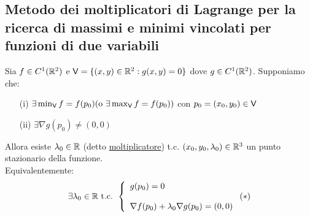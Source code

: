 \subsection{Metodo dei moltiplicatori di Lagrange per la ricerca di massimi e
minimi vincolati per funzioni di due variabili}
\begin{theorem}
  Sia $f \in C^1(\mathbb{R}^2)$ e $\mathsf{V} = \{(x,y)\in \mathbb{R}^2 : g(x,y) = 0\}$ dove $g \in C^1(\mathbb{R}^2)$. Supponiamo che:
  \begin{enumerate}
    \item[(i)] $\exists \min_{\mathsf{V}} f = f(p_0) (\text{o } \exists \max_{\mathsf{V}} f = f(p_0))$ con $p_0 = (x_0,y_0) \in \mathsf{V}$
    \item[(ii)] $\exists \nabla g(p_0) \not = (0,0)$
  \end{enumerate}
  Allora esiste $\lambda_0 \in \mathbb{R}$ (detto \underline{moltiplicatore}) t.c. $(x_0,y_0,\lambda_0)\in \mathbb{R}^3$ \ace un 
  punto stazionario della funzione. \\
  Equivalentemente: $$\exists\lambda_0 \in \mathbb{R} \text{ t.c. } \left\{\begin{array}{l}
    g(p_0) = 0 \\
    \\
    \nabla f(p_0) + \lambda_0 \nabla g(p_0) = (0,0) \\
  \end{array}\right. (*)  \label{tml_v2}$$
\end{theorem}